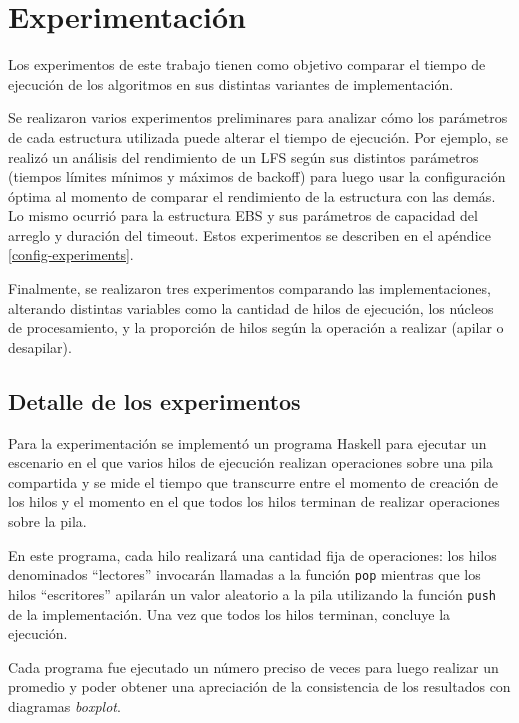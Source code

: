 \chapter{Experimentación}\label{chap:experiments}
Los experimentos de este trabajo tienen como objetivo comparar el tiempo de ejecución de los algoritmos en sus distintas variantes de implementación.

Se realizaron varios experimentos preliminares para analizar cómo los parámetros de cada estructura utilizada puede alterar el tiempo de ejecución.
Por ejemplo, se realizó un análisis del rendimiento de un LFS según sus distintos parámetros (tiempos límites mínimos y máximos de backoff) para luego usar la configuración óptima al momento de comparar el rendimiento de la estructura con las demás. Lo mismo ocurrió para la estructura EBS y sus parámetros de capacidad del arreglo y duración del timeout.  Estos experimentos se describen en el apéndice \ref{config-experiments}.

Finalmente, se realizaron tres experimentos comparando las implementaciones, alterando distintas variables como la cantidad de hilos de ejecución, los núcleos de procesamiento, y la proporción de hilos según la operación a realizar (apilar o desapilar).

\section{Detalle de los experimentos}\label{sec:experiment-details}

Para la experimentación se implementó un programa Haskell para ejecutar un escenario en el que varios hilos de ejecución realizan operaciones sobre una pila compartida y se mide el tiempo que transcurre entre el momento de creación de los hilos y el momento en el que todos los hilos terminan de realizar operaciones sobre la pila.

En este programa, cada hilo realizará una cantidad fija de operaciones: los hilos denominados ``lectores'' invocarán llamadas a la función \texttt{pop} mientras que los hilos ``escritores'' apilarán un valor aleatorio a la pila utilizando la función \texttt{push} de la implementación. Una vez que todos los hilos terminan, concluye la ejecución.

Cada programa fue ejecutado un número preciso de veces para luego realizar un promedio y poder obtener una apreciación de la consistencia de los resultados con diagramas \emph{boxplot}.

